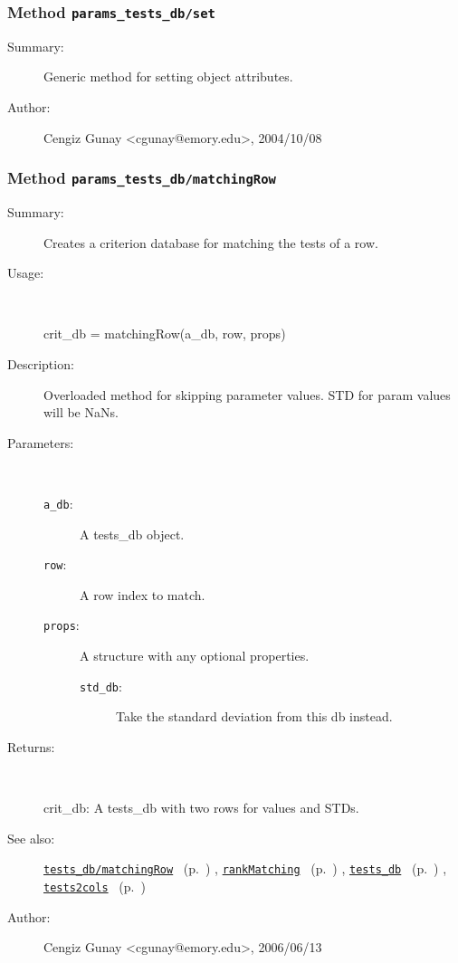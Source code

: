 \subsubsection[Method \texttt{set}]{Method \texttt{params\_tests\_db/set}}%
%
\label{ref_params_tests_db__set}%
\hypertarget{ref_params_tests_db__set}{}%
\begin{description}
\item[Summary:]Generic method for setting object attributes.
%
%
%
%
%
%
%
\item[Author:]%
Cengiz Gunay <cgunay@emory.edu>, 2004/10/08%
\end{description}
\methodline%
\subsubsection[Method \texttt{matchingRow}]{Method \texttt{params\_tests\_db/matchingRow}}%
%
\label{ref_params_tests_db__matchingRow}%
\hypertarget{ref_params_tests_db__matchingRow}{}%
\begin{description}
\item[Summary:]Creates a criterion database for matching the tests of a row.
%
\item[Usage:]~%
\begin{lyxcode}%
crit\_db = matchingRow(a\_db, row, props)
%
\end{lyxcode}%
%
\item[Description:]%
Overloaded method for skipping parameter values. STD for param values will be NaNs.
\item[Parameters:]~
\begin{description}%
\item[\texttt{a\_db}:]
 A tests\_db object.
\item[\texttt{row}:]
 A row index to match.
\item[\texttt{props}:]
 A structure with any optional properties.
\begin{description}%
\item[\texttt{std\_db}:]
 Take the standard deviation from this db instead.
\end{description}%
\end{description}%
%
\item[Returns:]~

	crit\_db: A tests\_db with two rows for values and STDs.
%
%
\item[See also:]%
\hyperlink{ref_tests_db__matchingRow}{\texttt{tests\_db/matchingRow}}%
\ (p.~\pageref{ref_tests_db__matchingRow})%
%
, \hyperlink{ref_rankMatching}{\texttt{rankMatching}}%
\ (p.~\pageref{ref_rankMatching})%
%
, \hyperlink{ref_tests_db}{\texttt{tests\_db}}%
\ (p.~\pageref{ref_tests_db})%
%
, \hyperlink{ref_tests2cols}{\texttt{tests2cols}}%
\ (p.~\pageref{ref_tests2cols})%
%
%
\item[Author:]%
Cengiz Gunay <cgunay@emory.edu>, 2006/06/13%
\end{description}
\methodline%
